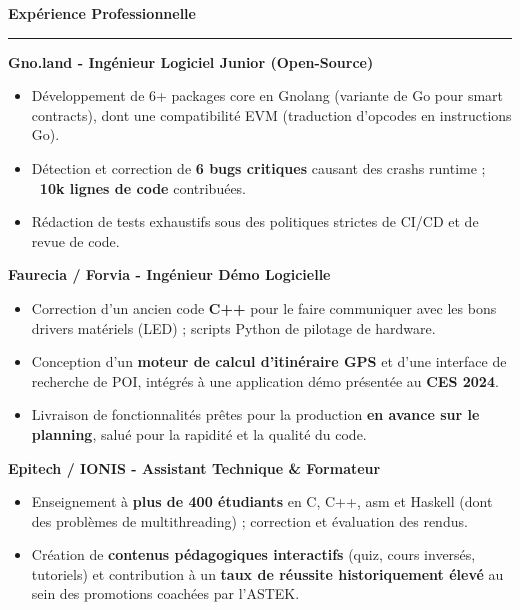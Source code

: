 \documentclass[9pt]{extarticle}
\begin{document}
\par\vspace{5pt}

{\large\bfseries Expérience Professionnelle}
\par\vspace{-8pt}
\rule{\linewidth}{0.4pt}
\par\vspace{5pt}

{\bfseries Gno.land - Ingénieur Logiciel Junior (Open-Source)}
\begin{itemize}[noitemsep, topsep=0pt]
	\item Développement de 6+ packages core en Gnolang (variante de Go pour smart contracts), dont une compatibilité EVM (traduction d'opcodes en instructions Go).
	\item Détection et correction de {\bfseries 6 bugs critiques} causant des crashs runtime ; {\bfseries ~10k lignes de code} contribuées.
	\item Rédaction de tests exhaustifs sous des politiques strictes de CI/CD et de revue de code.
\end{itemize}

\par\vspace{5pt}

{\bfseries Faurecia / Forvia - Ingénieur Démo Logicielle}
\begin{itemize}[noitemsep, topsep=0pt]
	\item Correction d'un ancien code {\bfseries C++} pour le faire communiquer avec les bons drivers matériels (LED) ; scripts Python de pilotage de hardware.
	\item Conception d'un {\bfseries moteur de calcul d'itinéraire GPS} et d'une interface de recherche de POI, intégrés à une application démo présentée au {\bfseries CES 2024}.
	\item Livraison de fonctionnalités prêtes pour la production {\bfseries en avance sur le planning}, salué pour la rapidité et la qualité du code.
\end{itemize}

\par\vspace{5pt}

{\bfseries Epitech / IONIS - Assistant Technique \& Formateur}
\begin{itemize}[noitemsep, topsep=0pt]
	\item Enseignement à {\bfseries plus de 400 étudiants} en C, C++, asm et Haskell (dont des problèmes de multithreading) ; correction et évaluation des rendus.
	\item Création de {\bfseries contenus pédagogiques interactifs} (quiz, cours inversés, tutoriels) et contribution à un {\bfseries taux de réussite historiquement élevé} au sein des promotions coachées par l'ASTEK.
\end{itemize}
\end{document}
